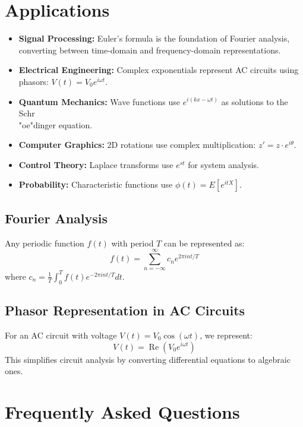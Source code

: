 \section{Applications}

\begin{itemize}
\item \textbf{Signal Processing:} Euler's formula is the foundation of Fourier analysis,
converting between time-domain and frequency-domain representations.
\item \textbf{Electrical Engineering:} Complex exponentials represent AC circuits
using phasors: $V(t) = V_0 e^{i\omega t}$.
\item \textbf{Quantum Mechanics:} Wave functions use $e^{i(kx - \omega t)}$ as solutions
to the Schr\\"oe"dinger equation.
\item \textbf{Computer Graphics:} 2D rotations use complex multiplication: $z' = z \cdot e^{i\theta}$.
\item \textbf{Control Theory:} Laplace transforms use $e^{st}$ for system analysis.
\item \textbf{Probability:} Characteristic functions use $\phi(t) = E[e^{itX}]$.
\end{itemize}

\subsection{Fourier Analysis}

Any periodic function $f(t)$ with period $T$ can be represented as:
\[
f(t) = \sum_{n=-\infty}^{\infty} c_n e^{2\pi i n t / T}
\]
where $c_n = \frac{1}{T}\int_0^T f(t) e^{-2\pi i n t / T} dt$.

\subsection{Phasor Representation in AC Circuits}

For an AC circuit with voltage $V(t) = V_0 \cos(\omega t)$, we represent:
\[
V(t) = \operatorname{Re}(V_0 e^{i\omega t})
\]
This simplifies circuit analysis by converting differential equations to algebraic ones.

\section{Frequently Asked Questions}


